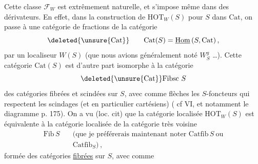 Cette classe $\mathcal F_W$ est extrêmement naturelle, et
s'impose même dans   des dérivateurs.
En effet, dans la construction de
$\mathrm{HOT}_W(S)$ pour $S$ dans $\mathrm{Cat}$, on passe
à une catégorie de fractions de la catégorie
\[
\deleted{\unsure{\mathrm{Cat}}}\qquad\mathrm{Cat}(S)=\underline{\mathrm{Hom}}\,(S,\mathrm{Cat})\,,
\]
par un localiseur $W(S)$ (que nous
avions généralement noté $W^{g}_S$  \ldots). Cette
catégorie  $\mathrm{Cat}(S)$ est d'autre part
isomorphe à la catégorie
\[
\deleted{\unsure{\mathrm{Cat}}}\mathrm{Fibsc}\ S
\]
des catégories fibrées et scindées sur $S$, avec
comme flèches les $S$-foncteurs qui respectent
les scindages (et en particulier cartésiens)
(\unsure{--} cf VI, et notamment le diagramme p. 175).
On a vu (loc. cit) que  la catégorie
localisée $\mathrm{HOT}_W(S)$ est équivalente à la
catégorie localisée de la catégorie très voisine
\[
\begin{aligned}
\mathrm{Fib}\, S\quad &\text{(que je préférerais maintenant noter }\mathrm{Catfib}\,S\ \text{ou}\\
&\mathrm{Catfib}_S)\,,
\end{aligned}
\]
formée des catégories \uline{fibrées} sur $S$, avec comme
